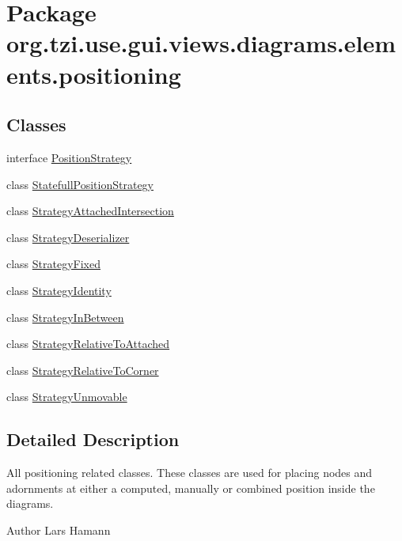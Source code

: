 \hypertarget{namespaceorg_1_1tzi_1_1use_1_1gui_1_1views_1_1diagrams_1_1elements_1_1positioning}{\section{Package org.\-tzi.\-use.\-gui.\-views.\-diagrams.\-elements.\-positioning}
\label{namespaceorg_1_1tzi_1_1use_1_1gui_1_1views_1_1diagrams_1_1elements_1_1positioning}
}
\subsection*{Classes}
\begin{DoxyCompactItemize}
\item 
interface \hyperlink{interfaceorg_1_1tzi_1_1use_1_1gui_1_1views_1_1diagrams_1_1elements_1_1positioning_1_1_position_strategy}{Position\-Strategy}
\item 
class \hyperlink{classorg_1_1tzi_1_1use_1_1gui_1_1views_1_1diagrams_1_1elements_1_1positioning_1_1_statefull_position_strategy}{Statefull\-Position\-Strategy}
\item 
class \hyperlink{classorg_1_1tzi_1_1use_1_1gui_1_1views_1_1diagrams_1_1elements_1_1positioning_1_1_strategy_attached_intersection}{Strategy\-Attached\-Intersection}
\item 
class \hyperlink{classorg_1_1tzi_1_1use_1_1gui_1_1views_1_1diagrams_1_1elements_1_1positioning_1_1_strategy_deserializer}{Strategy\-Deserializer}
\item 
class \hyperlink{classorg_1_1tzi_1_1use_1_1gui_1_1views_1_1diagrams_1_1elements_1_1positioning_1_1_strategy_fixed}{Strategy\-Fixed}
\item 
class \hyperlink{classorg_1_1tzi_1_1use_1_1gui_1_1views_1_1diagrams_1_1elements_1_1positioning_1_1_strategy_identity}{Strategy\-Identity}
\item 
class \hyperlink{classorg_1_1tzi_1_1use_1_1gui_1_1views_1_1diagrams_1_1elements_1_1positioning_1_1_strategy_in_between}{Strategy\-In\-Between}
\item 
class \hyperlink{classorg_1_1tzi_1_1use_1_1gui_1_1views_1_1diagrams_1_1elements_1_1positioning_1_1_strategy_relative_to_attached}{Strategy\-Relative\-To\-Attached}
\item 
class \hyperlink{classorg_1_1tzi_1_1use_1_1gui_1_1views_1_1diagrams_1_1elements_1_1positioning_1_1_strategy_relative_to_corner}{Strategy\-Relative\-To\-Corner}
\item 
class \hyperlink{classorg_1_1tzi_1_1use_1_1gui_1_1views_1_1diagrams_1_1elements_1_1positioning_1_1_strategy_unmovable}{Strategy\-Unmovable}
\end{DoxyCompactItemize}


\subsection{Detailed Description}
All positioning related classes. These classes are used for placing nodes and adornments at either a computed, manually or combined position inside the diagrams. \begin{DoxyAuthor}{Author}
Lars Hamann 
\end{DoxyAuthor}
